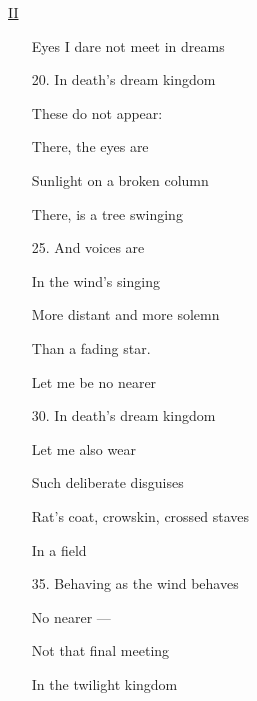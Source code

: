 \documentclass[10pt]{article}
\begin{document}
\begin{multicols}{2}
    \begin{minipage}[t][0.45\textheight]{0.4\textwidth}
        \begin{center} \underline{II} \end{center}
        \begin{enumerate}[itemsep=0ex]
            \item[] Eyes I dare not meet in dreams
            \item[20.] In death's dream kingdom
            \item[] These do not appear:
            \item[] There, the eyes are
            \item[] Sunlight on a broken column
            \item[] There, is a tree swinging
            \item[25.] And voices are
            \item[] In the wind's singing
            \item[] More distant and more solemn
            \item[] Than a fading star.
            \item[] Let me be no nearer\smallskip
            \item[30.] In death's dream kingdom
            \item[] Let me also wear
            \item[] Such deliberate disguises
            \item[] Rat's coat, crowskin, crossed staves
            \item[] In a field
            \item[35.] Behaving as the wind behaves
            \item[] No nearer ---
            \item[] Not that final meeting
            \item[] In the twilight kingdom
        \end{enumerate}
    \end{minipage}

\end{multicols}
\end{document}
